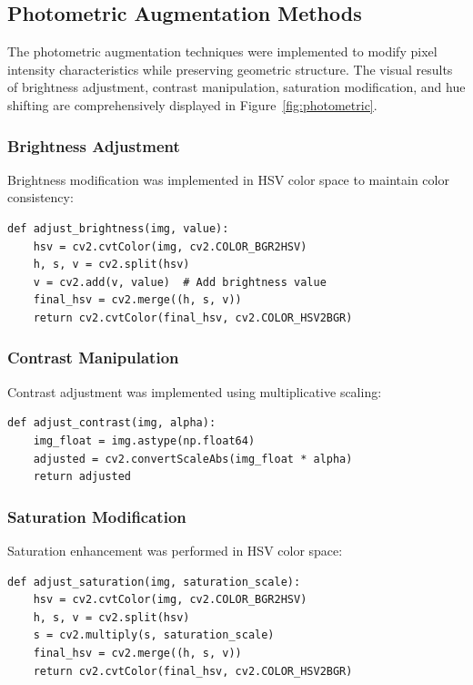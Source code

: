 \documentclass[a4paper, journal]{IEEEtran}
\begin{document}
\subsection{Photometric Augmentation Methods}

The photometric augmentation techniques were implemented to modify pixel intensity characteristics while preserving geometric structure. The visual results of brightness adjustment, contrast manipulation, saturation modification, and hue shifting are comprehensively displayed in Figure~\ref{fig:photometric}.

\subsubsection{Brightness Adjustment}
Brightness modification was implemented in HSV color space to maintain color consistency:

\begin{lstlisting}[caption=Brightness Adjustment Function]
def adjust_brightness(img, value):
    hsv = cv2.cvtColor(img, cv2.COLOR_BGR2HSV)
    h, s, v = cv2.split(hsv)
    v = cv2.add(v, value)  # Add brightness value
    final_hsv = cv2.merge((h, s, v))
    return cv2.cvtColor(final_hsv, cv2.COLOR_HSV2BGR)
\end{lstlisting}

\subsubsection{Contrast Manipulation}
Contrast adjustment was implemented using multiplicative scaling:

\begin{lstlisting}[caption=Contrast Adjustment Function]
def adjust_contrast(img, alpha):
    img_float = img.astype(np.float64)
    adjusted = cv2.convertScaleAbs(img_float * alpha)
    return adjusted
\end{lstlisting}

\subsubsection{Saturation Modification}
Saturation enhancement was performed in HSV color space:

\begin{lstlisting}[caption=Saturation Adjustment Function]
def adjust_saturation(img, saturation_scale):
    hsv = cv2.cvtColor(img, cv2.COLOR_BGR2HSV)
    h, s, v = cv2.split(hsv)
    s = cv2.multiply(s, saturation_scale)
    final_hsv = cv2.merge((h, s, v))
    return cv2.cvtColor(final_hsv, cv2.COLOR_HSV2BGR)
\end{lstlisting}
\end{document}
